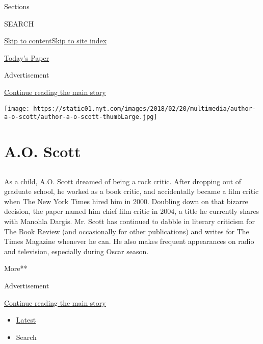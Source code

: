 Sections

SEARCH

\protect\hyperlink{site-content}{Skip to
content}\protect\hyperlink{site-index}{Skip to site index}

\href{https://myaccount.nytimes.com/auth/login?response_type=cookie\&client_id=vi}{}

\href{https://www.nytimes.com/section/todayspaper}{Today's Paper}

Advertisement

\protect\hyperlink{after-top}{Continue reading the main story}

\texttt{[image: https://static01.nyt.com/images/2018/02/20/multimedia/author-a-o-scott/author-a-o-scott-thumbLarge.jpg]}

\hypertarget{ao-scott}{%
\section{A.O. Scott}\label{ao-scott}}

\hypertarget{section}{%
\subsection{}\label{section}}

As a child, A.O. Scott dreamed of being a rock critic. After dropping
out of graduate school, he worked as a book critic, and accidentally
became a film critic when The New York Times hired him in 2000. Doubling
down on that bizarre decision, the paper named him chief film critic in
2004, a title he currently shares with Manohla Dargis. Mr. Scott has
continued to dabble in literary criticism for The Book Review (and
occasionally for other publications) and writes for The Times Magazine
whenever he can. He also makes frequent appearances on radio and
television, especially during Oscar season.

More**

Advertisement

\protect\hyperlink{after-mid1}{Continue reading the main story}

\begin{itemize}
\tightlist
\item
  \protect\hyperlink{stream-panel}{Latest}
\item
  Search
\end{itemize}

